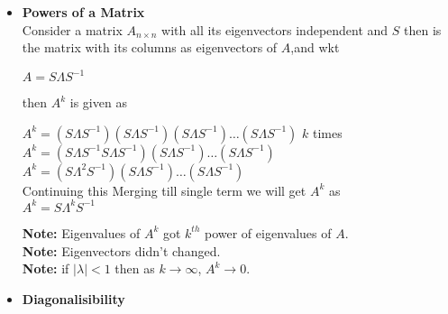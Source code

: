 \documentclass[a4paper,11pt]{article}
\numberwithin{equation}{section}
\begin{document}
\begin{itemize}
\item \textbf{Powers of a Matrix}\\

Consider a matrix $A_{n\times n}$ with all its eigenvectors independent and $S$ then is the matrix with its columns as eigenvectors of $A$,and wkt 
\begin{center}
    $A=S\varLambda S^{-1}$
\end{center}
then $A^k$ is given as 
\begin{center}
    $A^k=(S\varLambda S^{-1})(S\varLambda S^{-1})(S\varLambda S^{-1})\dots(S\varLambda S^{-1})$ $k$ times\\
    \vspace{3pt}
    $A^k=(S\varLambda S^{-1}S\varLambda S^{-1})(S\varLambda S^{-1})\dots(S\varLambda S^{-1})$
    \\
    \vspace{3pt}
    $A^k=(S\varLambda^2 S^{-1})(S\varLambda S^{-1})\dots(S\varLambda S^{-1})$\\
    \vspace{3pt}
    Continuing this Merging till single term we will get $A^k$ as\\
    \vspace{6pt}
    $A^k=S\varLambda^k S^{-1}$
\end{center}

\textbf{Note: }Eigenvalues of $A^k$ got $k^{th}$ power of eigenvalues of $A$.\\
\textbf{Note: }Eigenvectors didn't changed.\\
\textbf{Note: }if $\left|\lambda \right|<1$ then as $k\rightarrow \infty$, $A^k \rightarrow 0$.\\

\item \textbf{Diagonalisibility} \\


\end{itemize}
\end{document}
